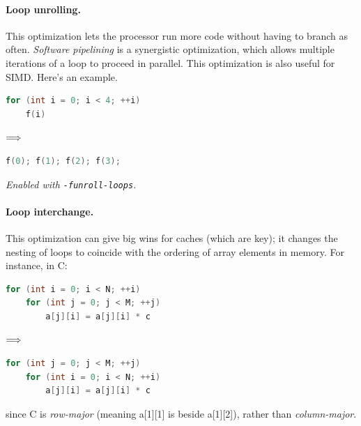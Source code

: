 \documentclass[a4paper]{report}
\begin{document}
\paragraph{Loop unrolling.} This optimization
lets the processor run more code without having to branch
as often. \emph{Software pipelining} is a synergistic optimization,
which allows multiple iterations of a loop to proceed in parallel.
This optimization is also useful for SIMD. Here's an example.
\begin{center}
\vspace*{-1em}
\begin{minipage}{.3\textwidth}
  \begin{lstlisting}[language=C]
for (int i = 0; i < 4; ++i)
    f(i)
  \end{lstlisting}
  \end{minipage} $\Longrightarrow \hspace*{2em}$ \begin{minipage}{.4\textwidth}
  \begin{lstlisting}[language=C]
f(0); f(1); f(2); f(3);
  \end{lstlisting}
  \end{minipage}
  \end{center}
\noindent \emph{Enabled with {\tt -funroll-loops}.}

\paragraph{Loop interchange.} This optimization can give big wins
for caches (which are key); it changes the nesting of loops to
coincide with the ordering of array elements in memory. For instance,
in C:
\begin{center}
\vspace*{-1em}
\begin{minipage}{.3\textwidth}
  \begin{lstlisting}[language=C]
for (int i = 0; i < N; ++i)
    for (int j = 0; j < M; ++j)
        a[j][i] = a[j][i] * c
  \end{lstlisting}
  \end{minipage} $\Longrightarrow \hspace*{2em}$ \begin{minipage}{.4\textwidth}
  \begin{lstlisting}[language=C]
for (int j = 0; j < M; ++j)
    for (int i = 0; i < N; ++i)
        a[j][i] = a[j][i] * c
  \end{lstlisting}
  \end{minipage}
  \end{center}
  since C is \emph{row-major} (meaning a[1][1] is beside a[1][2]),
rather than \emph{column-major}.
\end{document}

